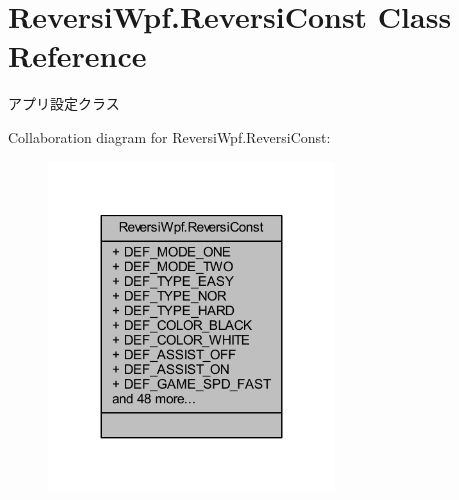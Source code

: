\hypertarget{class_reversi_wpf_1_1_reversi_const}{}\section{Reversi\+Wpf.\+Reversi\+Const Class Reference}
\label{class_reversi_wpf_1_1_reversi_const}


アプリ設定クラス  




Collaboration diagram for Reversi\+Wpf.\+Reversi\+Const\+:
\nopagebreak
\begin{figure}[H]
\begin{center}
\leavevmode
\includegraphics[width=215pt]{class_reversi_wpf_1_1_reversi_const__coll__graph}
\end{center}
\end{figure}
